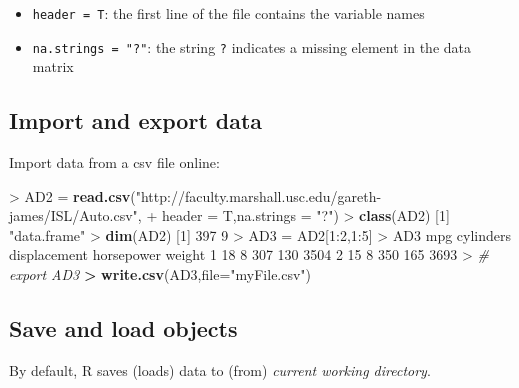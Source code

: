 \documentclass[]{article}
\newenvironment{Shaded}{\begin{snugshade}}{\end{snugshade}}
\newcommand{\KeywordTok}[1]{\textcolor[rgb]{0.13,0.29,0.53}{\textbf{{#1}}}}
\newcommand{\DataTypeTok}[1]{\textcolor[rgb]{0.13,0.29,0.53}{{#1}}}
\newcommand{\DecValTok}[1]{\textcolor[rgb]{0.00,0.00,0.81}{{#1}}}
\newcommand{\StringTok}[1]{\textcolor[rgb]{0.31,0.60,0.02}{{#1}}}
\newcommand{\CommentTok}[1]{\textcolor[rgb]{0.56,0.35,0.01}{\textit{{#1}}}}
\newcommand{\ErrorTok}[1]{\textcolor[rgb]{0.64,0.00,0.00}{\textbf{{#1}}}}
\newcommand{\NormalTok}[1]{{#1}}
\providecommand{\tightlist}{%
  \setlength{\itemsep}{0pt}\setlength{\parskip}{0pt}}
\begin{document}
\begin{itemize}
\tightlist
\item
  \texttt{header\ =\ T}: the first line of the file contains the
  variable names
\item
  \texttt{na.strings\ =\ "?"}: the string \texttt{?} indicates a missing
  element in the data matrix
\end{itemize}

\subsection{Import and export data}\label{import-and-export-data-2}

Import data from a csv file online:

\begin{Shaded}
\begin{Highlighting}[]
\NormalTok{>}\StringTok{ }\NormalTok{AD2 =}\StringTok{ }\KeywordTok{read.csv}\NormalTok{(}\StringTok{"http://faculty.marshall.usc.edu/gareth-james/ISL/Auto.csv"}\NormalTok{,}
\NormalTok{+}\StringTok{                  }\DataTypeTok{header =} \NormalTok{T,}\DataTypeTok{na.strings =} \StringTok{"?"}\NormalTok{)}
\NormalTok{>}\StringTok{ }\KeywordTok{class}\NormalTok{(AD2)}
\NormalTok{[}\DecValTok{1}\NormalTok{] }\StringTok{"data.frame"}
\NormalTok{>}\StringTok{ }\KeywordTok{dim}\NormalTok{(AD2)}
\NormalTok{[}\DecValTok{1}\NormalTok{] }\DecValTok{397}   \DecValTok{9}
\NormalTok{>}\StringTok{ }\NormalTok{AD3 =}\StringTok{ }\NormalTok{AD2[}\DecValTok{1}\NormalTok{:}\DecValTok{2}\NormalTok{,}\DecValTok{1}\NormalTok{:}\DecValTok{5}\NormalTok{]}
\NormalTok{>}\StringTok{ }\NormalTok{AD3}
  \NormalTok{mpg cylinders displacement horsepower weight}
\DecValTok{1}  \DecValTok{18}         \DecValTok{8}          \DecValTok{307}        \DecValTok{130}   \DecValTok{3504}
\DecValTok{2}  \DecValTok{15}         \DecValTok{8}          \DecValTok{350}        \DecValTok{165}   \DecValTok{3693}
\NormalTok{>}\StringTok{ }\CommentTok{# export AD3}
\ErrorTok{>}\StringTok{ }\KeywordTok{write.csv}\NormalTok{(AD3,}\DataTypeTok{file=}\StringTok{"myFile.csv"}\NormalTok{)}
\end{Highlighting}
\end{Shaded}

\subsection{Save and load objects}\label{save-and-load-objects}

By default, R saves (loads) data to (from) \emph{current working
directory}.
\end{document}
